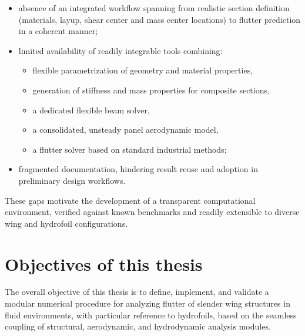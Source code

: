 \begin{itemize}
    \item absence of an integrated workflow spanning from realistic section definition (materials, layup, shear center and mass center locations) to flutter prediction in a coherent manner;
    \item limited availability of readily integrable tools combining:
    \begin{itemize}
        \item flexible parametrization of geometry and material properties,
        \item generation of stiffness and mass properties for composite sections,
        \item a dedicated flexible beam solver,
        \item a consolidated, unsteady panel aerodynamic model,
        \item a flutter solver based on standard industrial methods;
    \end{itemize}
    \item fragmented documentation, hindering result reuse and adoption in preliminary design workflows.
\end{itemize}

These gaps motivate the development of a transparent computational environment, verified against known benchmarks and readily extensible 
to diverse wing and hydrofoil configurations.

\section{Objectives of this thesis}
The overall objective of this thesis is to define, implement, and validate a modular numerical procedure for analyzing flutter of slender wing structures 
in fluid environments, with particular reference to hydrofoils, based on the seamless coupling of structural, aerodynamic, and hydrodynamic analysis modules.

